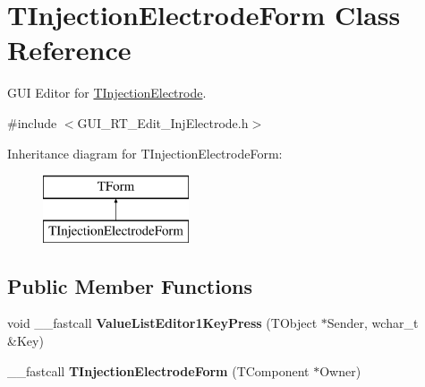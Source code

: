 \hypertarget{class_t_injection_electrode_form}{\section{T\+Injection\+Electrode\+Form Class Reference}
\label{class_t_injection_electrode_form}
}


G\+U\+I Editor for \hyperlink{class_t_injection_electrode}{T\+Injection\+Electrode}.  




{\ttfamily \#include $<$G\+U\+I\+\_\+\+R\+T\+\_\+\+Edit\+\_\+\+Inj\+Electrode.\+h$>$}

Inheritance diagram for T\+Injection\+Electrode\+Form\+:\begin{figure}[H]
\begin{center}
\leavevmode
\includegraphics[height=2.000000cm]{class_t_injection_electrode_form}
\end{center}
\end{figure}
\subsection*{Public Member Functions}
\begin{DoxyCompactItemize}
\item 
\hypertarget{class_t_injection_electrode_form_ac01b7a316e160953c4bbab8d0390004a}{void \+\_\+\+\_\+fastcall {\bfseries Value\+List\+Editor1\+Key\+Press} (T\+Object $\ast$Sender, wchar\+\_\+t \&Key)}\label{class_t_injection_electrode_form_ac01b7a316e160953c4bbab8d0390004a}

\item 
\hypertarget{class_t_injection_electrode_form_a0305d33ca929f94292adffb076ee0706}{\+\_\+\+\_\+fastcall {\bfseries T\+Injection\+Electrode\+Form} (T\+Component $\ast$Owner)}\label{class_t_injection_electrode_form_a0305d33ca929f94292adffb076ee0706}

\end{DoxyCompactItemize}
